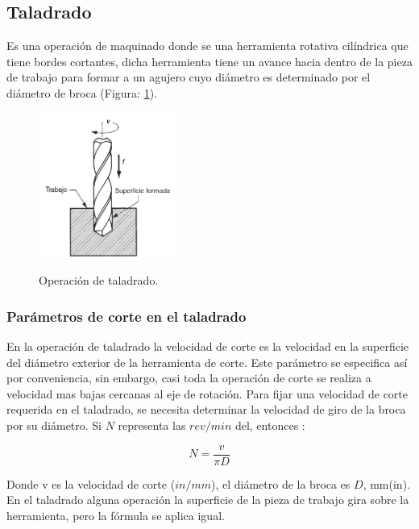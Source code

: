 \subsection*{Taladrado}

Es una operación de maquinado donde se una herramienta rotativa cilíndrica que tiene bordes cortantes, dicha herramienta tiene un avance hacia dentro de la pieza de trabajo para formar a un agujero cuyo diámetro es determinado por el diámetro de broca    \citep{groover2007fundamentals}(Figura: \ref{Fig:taradrado}).  

\begin{figure}[ht]
    \centering
    \includegraphics[width = 0.4\textwidth]{Cap1_FormulaciondelProyecto/Figuras/Taradrado1.PNG}
    \caption{Operación de taladrado.}
    \citep{groover2007fundamentals}
    \label{Fig:taradrado}
\end{figure}

\subsubsection{Parámetros de corte en el taladrado}

En la operación de taladrado la velocidad de corte es la velocidad en la superficie del diámetro exterior de la herramienta de corte. Este parámetro se especifica así por conveniencia, sin embargo, casi toda la operación de corte se realiza a velocidad mas bajas cercanas al eje de rotación. Para fijar una velocidad de corte requerida en el taladrado, se necesita determinar la velocidad de giro de la broca por su diámetro. Si $N$ representa las $rev/min$ del, entonces \citep{groover2007fundamentals}:

\begin{equation}
    N=\frac{v}{\pi D}
\end{equation}

Donde v es la velocidad de corte ($in/mm$), el diámetro de la broca es $D$, mm(in). En el taladrado alguna operación la superficie de la pieza de trabajo gira sobre la herramienta, pero la fórmula se aplica igual\citep{groover2007fundamentals}.

